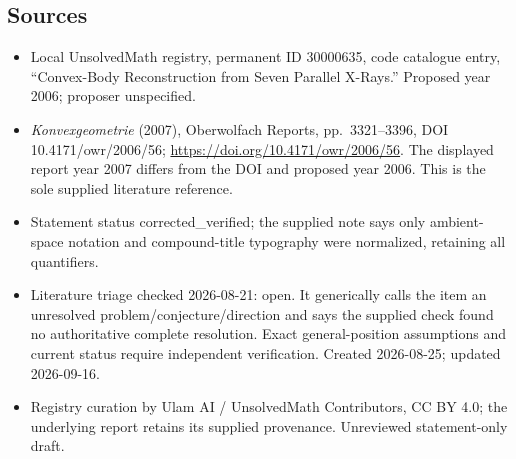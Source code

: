 \documentclass[11pt]{article}
\begin{document}
\subsection{Sources}
\begin{itemize}
\item Local UnsolvedMath registry, permanent ID 30000635, code catalogue entry, ``Convex-Body Reconstruction from Seven Parallel X-Rays.'' Proposed year 2006; proposer unspecified.
\item \emph{Konvexgeometrie} (2007), Oberwolfach Reports, pp.\ 3321--3396, DOI 10.4171/owr/2006/56; \url{https://doi.org/10.4171/owr/2006/56}. The displayed report year 2007 differs from the DOI and proposed year 2006. This is the sole supplied literature reference.
\item Statement status corrected\_verified; the supplied note says only ambient-space notation and compound-title typography were normalized, retaining all quantifiers.
\item Literature triage checked 2026-08-21: open. It generically calls the item an unresolved problem/conjecture/direction and says the supplied check found no authoritative complete resolution. Exact general-position assumptions and current status require independent verification. Created 2026-08-25; updated 2026-09-16.
\item Registry curation by Ulam AI / UnsolvedMath Contributors, CC BY 4.0; the underlying report retains its supplied provenance. Unreviewed statement-only draft.
\end{itemize}
\end{document}
